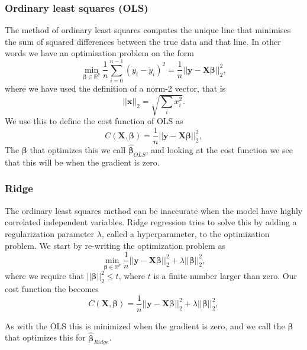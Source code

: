 \subsubsection{Ordinary least squares (OLS)}
{
    The method of ordinary least squares computes the unique line that minimises the sum of squared differences between the true data and that line.
    In other words we have an optimisation problem on the form
    \begin{equation*}
        {\displaystyle \min_{\boldsymbol{\beta}
        \in{\mathbb{R}}^{p}}}\frac{1}{n}\sum_{i=0}^{n-1}\left(y_i-\tilde{y}_i\right)^2
        =\frac{1}{n}\vert\vert \boldsymbol{y}-\boldsymbol{X}\boldsymbol{\beta}\vert\vert_2^2,
    \end{equation*}
    where we have used the definition of a norm-2 vector, that is
    \begin{equation*}
        \vert\vert \boldsymbol{x}\vert\vert_2 = \sqrt{\sum_i x_i^2}.
    \end{equation*}
    We use this to define the cost function of OLS as
    \begin{equation}
    \label{eq:cost_ols}
        C(\boldsymbol{X}, \boldsymbol\beta) 
        =\frac{1}{n}\vert\vert \boldsymbol{y}-\boldsymbol{X}\boldsymbol{\beta}\vert\vert_2^2,
    \end{equation}
    The $\boldsymbol\beta$ that optimizes this we call $\hat{\boldsymbol\beta}_{OLS}$, and looking at the cost function we see that this will be when the gradient is zero. 
}

\subsubsection{Ridge}
{
    The ordinary least squares method can be inaccurate when the model have highly correlated independent variables. 
    Ridge regression tries to solve this by adding a regularization parameter $\lambda$, called a hyperparameter, to the optimization problem. 
    We start by re-writing the optimization problem as 
    \begin{equation*}
        {\displaystyle \min_{\boldsymbol{\beta}\in
        {\mathbb{R}}^{p}}}\frac{1}{n}\vert\vert \boldsymbol{y}
        -\boldsymbol{X}\boldsymbol{\beta}\vert\vert_2^2+\lambda\vert\vert \boldsymbol{\beta}\vert\vert_2^2,
    \end{equation*}
    where we require that $\vert\vert \boldsymbol{\beta}\vert\vert_2^2\le t$, where $t$ is a finite number larger than zero. Our cost function the becomes
    \begin{equation}
    \label{eq:cost_ridge}
        C(\boldsymbol{X},\boldsymbol{\beta}
        )=\frac{1}{n}\vert\vert \boldsymbol{y}
        -\boldsymbol{X}\boldsymbol{\beta}\vert\vert_2^2+\lambda\vert\vert \boldsymbol{\beta}\vert\vert_2^2,
    \end{equation}

    As with the OLS this is minimized when the gradient is zero, and we call the $\boldsymbol\beta$ that optimizes this for $\hat{\boldsymbol\beta}_{Ridge}$. 
}

